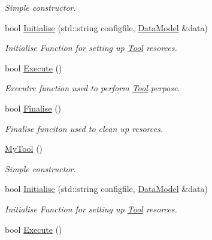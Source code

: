 \begin{DoxyCompactItemize}
\begin{DoxyCompactList}\small\item\em Simple constructor. \end{DoxyCompactList}\item 
bool \hyperlink{classMyTool_a3bf60061195a18542c4cfb2916b9dad9}{Initialise} (std\-::string configfile, \hyperlink{classDataModel}{Data\-Model} \&data)
\begin{DoxyCompactList}\small\item\em Initialise Function for setting up \hyperlink{classTool}{Tool} resorces. \end{DoxyCompactList}\item 
\hypertarget{classMyTool_a0a58122023af90b9200d0e71e89cfb36}{bool \hyperlink{classMyTool_a0a58122023af90b9200d0e71e89cfb36}{Execute} ()}\label{classMyTool_a0a58122023af90b9200d0e71e89cfb36}

\begin{DoxyCompactList}\small\item\em Executre function used to perform \hyperlink{classTool}{Tool} perpose. \end{DoxyCompactList}\item 
\hypertarget{classMyTool_a060ec6356451aa335d0de41093c9992f}{bool \hyperlink{classMyTool_a060ec6356451aa335d0de41093c9992f}{Finalise} ()}\label{classMyTool_a060ec6356451aa335d0de41093c9992f}

\begin{DoxyCompactList}\small\item\em Finalise funciton used to clean up resorces. \end{DoxyCompactList}\item 
\hypertarget{classMyTool_ad85b796bdd675ae22e69cf40fe7b6314}{\hyperlink{classMyTool_ad85b796bdd675ae22e69cf40fe7b6314}{My\-Tool} ()}\label{classMyTool_ad85b796bdd675ae22e69cf40fe7b6314}

\begin{DoxyCompactList}\small\item\em Simple constructor. \end{DoxyCompactList}\item 
bool \hyperlink{classMyTool_a3bf60061195a18542c4cfb2916b9dad9}{Initialise} (std\-::string configfile, \hyperlink{classDataModel}{Data\-Model} \&data)
\begin{DoxyCompactList}\small\item\em Initialise Function for setting up \hyperlink{classTool}{Tool} resorces. \end{DoxyCompactList}\item 
\hypertarget{classMyTool_a0a58122023af90b9200d0e71e89cfb36}{bool \hyperlink{classMyTool_a0a58122023af90b9200d0e71e89cfb36}{Execute} ()}\label{classMyTool_a0a58122023af90b9200d0e71e89cfb36}


\end{DoxyCompactItemize}
